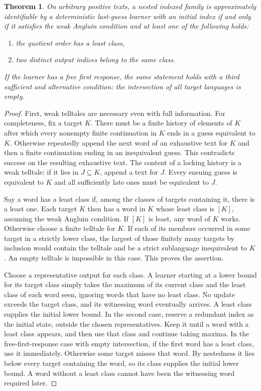 \documentclass[11pt]{article}
\newtheorem{theorem}{Theorem}
\begin{document}
\begin{theorem}\label{chain}
On arbitrary positive texts, a nested indexed family is approximately identifiable by a deterministic last-guess learner with an initial index if and only if it satisfies the weak Angluin condition and at least one of the following holds:
\begin{enumerate}
\item the quotient order has a least class,
\item two distinct output indices belong to the same class.
\end{enumerate}
If the learner has a free first response, the same statement holds with a third sufficient and alternative condition: the intersection of all target languages is empty.
\end{theorem}
\begin{proof}
First, weak telltales are necessary even with full information. For completeness, fix a target $K$. There must be a finite history of elements of $K$ after which every nonempty finite continuation in $K$ ends in a guess equivalent to $K$. Otherwise repeatedly append the next word of an exhaustive text for $K$ and then a finite continuation ending in an inequivalent guess. This contradicts success on the resulting exhaustive text. The content of a locking history is a weak telltale: if it lies in $J\subseteq K$, append a text for $J$. Every ensuing guess is equivalent to $K$ and all sufficiently late ones must be equivalent to $J$.

Say a word has a least class if, among the classes of targets containing it, there is a least one. Each target $K$ then has a word in $K$ whose least class is $[K]$, assuming the weak Angluin condition. If $[K]$ is least, any word of $K$ works. Otherwise choose a finite telltale for $K$. If each of its members occurred in some target in a strictly lower class, the largest of those finitely many targets by inclusion would contain the telltale and be a strict sublanguage inequivalent to $K$. An empty telltale is impossible in this case. This proves the assertion.

Choose a representative output for each class. A learner starting at a lower bound for its target class simply takes the maximum of its current class and the least class of each word seen, ignoring words that have no least class. No update exceeds the target class, and its witnessing word eventually arrives. A least class supplies the initial lower bound. In the second case, reserve a redundant index as the initial state, outside the chosen representatives. Keep it until a word with a least class appears, and then use that class and continue taking maxima. In the free-first-response case with empty intersection, if the first word has a least class, use it immediately. Otherwise some target misses that word. By nestedness it lies below every target containing the word, so its class supplies the initial lower bound. A word without a least class cannot have been the witnessing word required later.


\end{proof}
\end{document}
